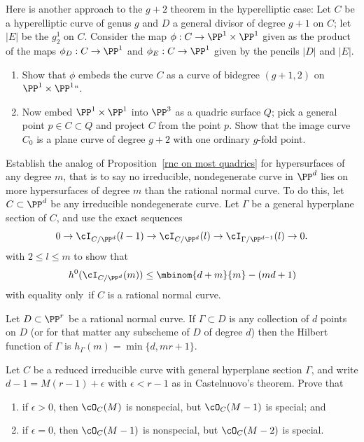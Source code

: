 \begin{exercise}
Here is another approach to the $g+2$ theorem in the hyperelliptic case:
%
Let $C$ be a
hyperelliptic
%
curve of genus $g$ and $D$ a general divisor
of degree $g+1$ on $C$; let $|E|$ be the $g^1_2$ on $C$.
Consider the map $\phi : C \to \PP^1 \times \PP^1$ given as the product
of the maps $\phi_D : C \to \PP^1$ and $\phi_E : C \to \PP^1$ given by
the pencils $|D|$ and $|E|$.
\begin{enumerate}
\item Show that $\phi$ embeds the curve $C$ as a curve of bidegree
$(g+1,2)$ on $\PP^1 \times \PP^1` `$.
\item Now embed $\PP^1 \times \PP^1$ into $\PP^3$ as a quadric surface
$Q$; pick a general point $p \in C \subset Q$ and project $C$ from the
point $p$. Show that the image curve $C_0$ is a plane curve of degree
$g+2$ with one ordinary $g$-fold point.
\end{enumerate}
\end{exercise}

\begin{exercise}\label{extremal m-ics}
Establish the analog of Proposition~\ref{rnc on most quadrics}
for hypersurfaces of any degree $m$, that is to say no irreducible,
nondegenerate curve in $\PP^d$ lies on more hypersurfaces of degree $m$
than the
rational normal curve.
%
To do this, let $C\subset \PP^d$ be any irreducible nondegenerate
curve. Let $\Gamma$ be a general hyperplane section
of $C$, and use the exact sequences
$$
0 \to \cI_{C/\PP^d}(l-1) \to \cI_{C/\PP^d}(l) \to
\cI_{\Gamma/\PP^{d-1}}(l) \to 0.
$$
with $2 \leq l \leq m$ to show that
$$
h^0(\cI_{C/\PP^d}(m)) \leq  \mbinom{d+m}{m} - (md+1)
$$
with equality only~if $C$ is a rational normal curve.
\end{exercise}

\begin{exercise}\label{linear bound is sharp}
Let $D \subset \PP^r$ be a rational normal curve. If $\Gamma \subset D$
is any collection of $d$ points on $D$ (or for that matter any subscheme
of $D$ of degree $d$) then the
Hilbert function
%
of $\Gamma$ is
$ h_\Gamma(m) = \min\{d, mr+1\} $.
\end{exercise}

\begin{exercise}
Let $C$ be a reduced irreducible curve with general hyperplane section
$\Gamma$,
and write
$d-1 = M(r-1) +\epsilon$ with $\epsilon<r-1$ as in Castelnuovo's theorem.
Prove that
\begin{enumerate}
\item if $\epsilon > 0$, then $\cO_C(M)$ is nonspecial, but $\cO_C(M-1)$
is special; and
\item if $\epsilon = 0$, then $\cO_C(M-1)$ is nonspecial, but $\cO_C(M-2)$
%
is special.
\end{enumerate}
\end{exercise}

